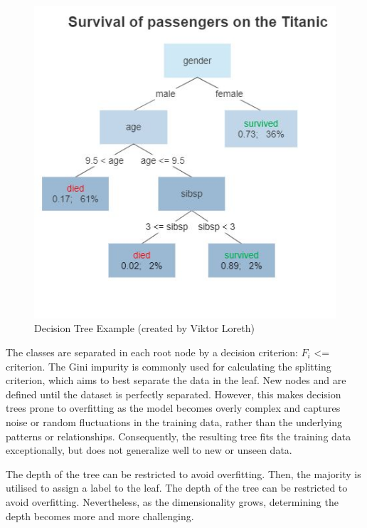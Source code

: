 \begin{figure}[h!]
	\centering
	\includegraphics[width=150mm]{figs/decision_tree}
	\caption[Decision Tree Example]{Decision Tree Example (created by Viktor Loreth)} 
	\label{fig:Decision_tree}
\end{figure}

The classes are separated in each root node by a decision criterion: $F_i$ <= criterion. The Gini impurity is commonly used for calculating the splitting criterion, which aims to best separate the data in the leaf. New nodes and are defined until the dataset is perfectly separated. However, this makes decision trees prone to overfitting as the model becomes overly complex and captures noise or random fluctuations in the training data, rather than the underlying patterns or relationships. Consequently, the resulting tree fits the training data exceptionally, but does not generalize well to new or unseen data. 

The depth of the tree can be restricted to avoid overfitting. Then, the majority is utilised to assign a label to the leaf. The depth of the tree can be restricted to avoid overfitting. Nevertheless, as the dimensionality grows, determining the depth becomes more and more challenging.

